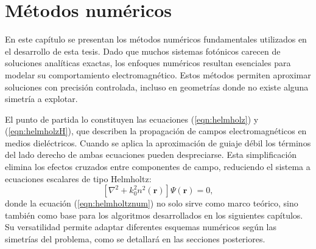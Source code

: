 \chapter{Métodos numéricos}
En este capítulo se presentan los métodos numéricos fundamentales utilizados en el desarrollo de esta tesis. Dado que muchos sistemas fotónicos carecen de soluciones analíticas exactas, los enfoques numéricos resultan esenciales para modelar su comportamiento electromagnético. Estos métodos permiten aproximar soluciones con precisión controlada, incluso en geometrías donde no existe alguna simetría a explotar.

El punto de partida lo constituyen las ecuaciones (\ref{eqn:helmholz}) y (\ref{eqn:helmholzH}), que describen la propagación de campos electromagnéticos en medios dieléctricos. Cuando se aplica la aproximación de guiaje débil los términos del lado derecho de ambas ecuaciones pueden despreciarse. Esta simplificación elimina los efectos cruzados entre componentes de campo, reduciendo el sistema a ecuaciones escalares de tipo Helmholtz:
\begin{equation}
\left[\nabla^2 + k_0^2 n^2(\textbf{r})\right]\Psi(\textbf{r}) = 0, \label{eqn:helmholtznum}
\end{equation}
donde la ecuación (\ref{eqn:helmholtznum}) no solo sirve como marco teórico, sino también como base para los algoritmos desarrollados en los siguientes capítulos. Su versatilidad permite adaptar diferentes esquemas numéricos según las simetrías del problema, como se detallará en las secciones posteriores.
